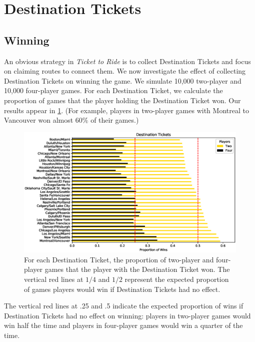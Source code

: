 \newpage
\section{Destination Tickets}

\subsection{Winning}
\label{sec:winning}
An obvious strategy in \textit{Ticket to Ride} is to collect
Destination Tickets and focus on claiming routes to connect them.
We now investigate the effect of collecting Destination Tickets
on winning the game.
We simulate 10,000 two-player and 10,000 four-player games.
For each Destination Ticket, we calculate the proportion of 
games that the player holding the Destination Ticket won.
Our results appear in \cref{fig:tickets}.
(For example, players in two-player games with Montreal 
to Vancouver won almost $60\%$ of their games.)

\begin{figure}[H]
\centering
\includegraphics[scale=.6]{figures/destination_tickets}
\caption{For each Destination Ticket,
the proportion of two-player and four-player games that 
the player with the Destination Ticket won.
The vertical red lines at $1/4$ and $1/2$ represent
the expected proportion of games players would win
if Destination Tickets had no effect.}
\label{fig:tickets}
\end{figure}

The vertical red lines at .25 and .5 indicate
the expected proportion of wins if Destination Tickets
had no effect on winning: players in two-player games
would win half the time and players in four-player games
would win a quarter of the time.

